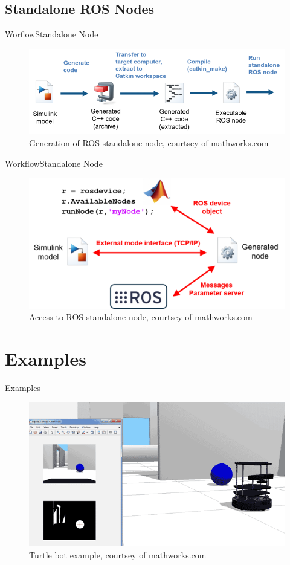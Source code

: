 \documentclass{beamer}
\begin{document}
\subsection{Standalone ROS Nodes}
\begin{frame}{Worflow}{Standalone Node}
\begin{figure}
\includegraphics[scale=0.4]{figs/img/rosstandalone.png}
\caption{Generation of ROS standalone node, courtsey of mathworks.com}
\end{figure}
\end{frame}
\begin{frame}{Workflow}{Standalone Node}
\begin{figure}
\includegraphics[scale=0.4]{figs/img/rosstandalone2.png}
\caption{Access to ROS standalone node, courtsey of mathworks.com}
\end{figure}
\end{frame}

\section{Examples}
\begin{frame}{Examples}
\begin{figure}
\includegraphics[scale=0.5]{figs/img/turtlebot.png}
\caption{Turtle bot example, courtsey of mathworks.com}
\end{figure}
\end{frame}
\end{document}
